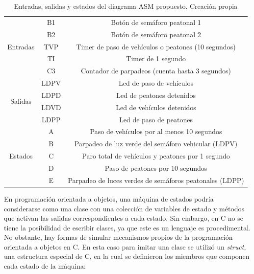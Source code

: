 \begin{table}[H]
\centering
\renewcommand{\arraystretch}{1.25}
\begin{tabular}{|c|c|c|}
\hline
\multirow{5}{*}{Entradas} & B1   & Botón de semáforo peatonal 1                            \\ \cline{2-3} 
                          & B2   & Botón de semáforo peatonal 2                            \\ \cline{2-3} 
                          & TVP  & Timer de paso de vehículos o peatones (10 segundos)     \\ \cline{2-3} 
                          & TI   & Timer de 1 segundo                                      \\ \cline{2-3} 
                          & C3   & Contador de parpadeos (cuenta hasta 3 segundos)         \\ \hline
\multirow{4}{*}{Salidas}  & LDPV & Led de paso de vehículos                                \\ \cline{2-3} 
                          & LDPD & Led de peatones detenidos                               \\ \cline{2-3} 
                          & LDVD & Led de vehículos detenidos                              \\ \cline{2-3} 
                          & LDPP & Led de paso de peatones                                 \\ \hline
\multirow{5}{*}{Estados}  & A    & Paso de vehículos por al menos 10 segundos              \\ \cline{2-3} 
                          & B    & Parpadeo de luz verde del semáforo vehicular (LDPV)     \\ \cline{2-3} 
                          & C    & Paro total de vehículos y peatones por 1 segundo        \\ \cline{2-3} 
                          & D    & Paso de peatones por 10 segundos                        \\ \cline{2-3} 
                          & E    & Parpadeo de luces verdes de semáforos peatonales (LDPP) \\ \hline
\end{tabular}
\caption{Entradas, salidas y estados del diagrama ASM propuesto. Creación propia}
\renewcommand{\arraystretch}{1}
\end{table}

En programación orientada a objetos, una máquina de estados podría considerarse como una clase con una colección de variables de estado y métodos que activan las salidas correspondientes a cada estado. Sin embargo, en C no se tiene la posibilidad de escribir clases, ya que este es un lenguaje es procedimental. No obstante, hay formas de simular mecanismos propios de la programación orientada a objetos en C. En esta caso para imitar una clase se utilizó un \textit{struct}, una estructura especial de C, en la cual se definieron los miembros que componen cada estado de la máquina:


